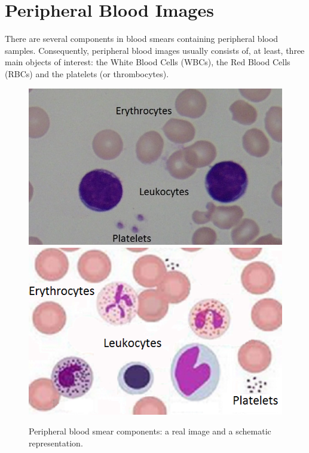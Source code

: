 \documentclass[final,a4paper,12pt,english]{UnicaPhdThesis3}
\begin{document}
\section{Peripheral Blood Images}
There are several components in blood smears containing peripheral blood samples. Consequently, peripheral blood images usually consists of, at least, three main objects of interest: the White Blood Cells (\acs{WBC}s), the Red Blood Cells (\acs{RBC}s) and the platelets (or thrombocytes). 

\begin{figure}[!htbp]
\centering
\includegraphics[height=0.21\textheight]{images/Cells1}
\includegraphics[height=0.21\textheight]{images/Cells2}
\caption{\label{fig:leukocytes} Peripheral blood smear components: a real image and a schematic representation.}
\end{figure}
\end{document}
